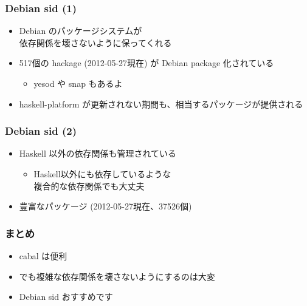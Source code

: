 \documentclass[cjk,dvipdfm,14pt]{beamer}
\begin{document}
\begin{frame}
\frametitle{Debian sid (1)}

\begin{itemize}
\item Debian のパッケージシステムが\\依存関係を壊さないように保ってくれる
\item 517個の hackage (2012-05-27現在) が Debian package 化されている
  \begin{itemize}
  \item yesod や snap もあるよ
  \end{itemize}
\item haskell-platform が更新されない期間も、相当するパッケージが提供される
\end{itemize}

\end{frame}

\begin{frame}
\frametitle{Debian sid (2)}

\begin{itemize}
\item Haskell 以外の依存関係も管理されている
  \begin{itemize}
  \item Haskell以外にも依存しているような\\複合的な依存関係でも大丈夫
  \end{itemize}
\item 豊富なパッケージ (2012-05-27現在、37526個)
\end{itemize}

\end{frame}

\begin{frame}
\frametitle{まとめ}

\begin{itemize}
\item cabal は便利
\item でも複雑な依存関係を壊さないようにするのは大変
\item Debian sid おすすめです
\end{itemize}

\end{frame}
\end{document}
